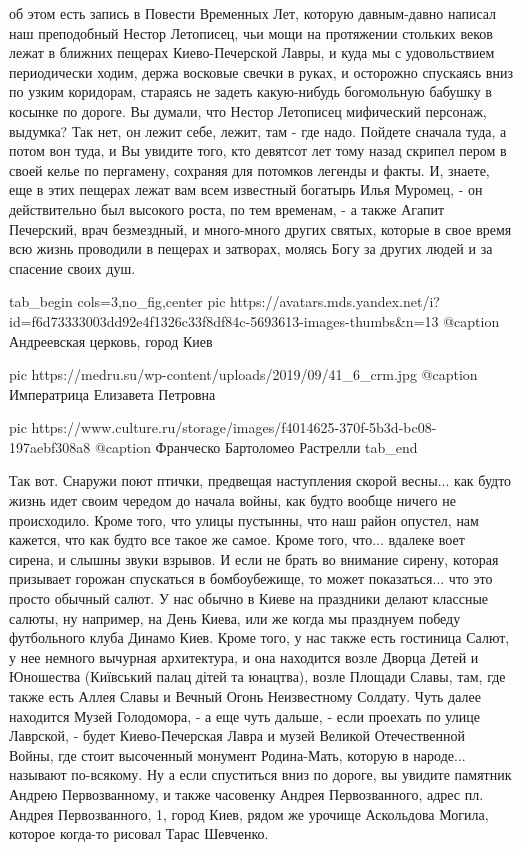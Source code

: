 об этом есть запись в Повести Временных Лет, которую давным-давно написал наш
преподобный Нестор Летописец, чьи мощи на протяжении стольких веков лежат в
ближних пещерах Киево-Печерской Лавры, и куда мы с удовольствием периодически
ходим, держа восковые свечки в руках, и осторожно спускаясь вниз по узким
коридорам, стараясь не задеть какую-нибудь богомольную бабушку в
косынке по дороге. Вы думали, что Нестор Летописец мифический персонаж,
выдумка? Так нет, он лежит себе, лежит, там - где надо. Пойдете сначала туда, а
потом вон туда, и Вы увидите того, кто девятсот лет тому назад скрипел пером в
своей келье по пергамену, сохраняя для потомков легенды и факты. И, знаете, еще
в этих пещерах лежат вам всем известный богатырь Илья Муромец, - он
действительно был высокого роста, по тем временам, - а также Агапит Печерский,
врач безмездный, и много-много других святых, которые в свое время всю жизнь
проводили в пещерах и затворах, молясь Богу за других людей и за спасение своих
душ.

\ifcmt
  tab_begin cols=3,no_fig,center
     pic https://avatars.mds.yandex.net/i?id=f6d73333003dd92e4f1326c33f8df84c-5693613-images-thumbs&n=13
		 @caption Андреевская церковь, город Киев

		 pic https://medru.su/wp-content/uploads/2019/09/41_6_crm.jpg
		 @caption Императрица Елизавета Петровна

		 pic https://www.culture.ru/storage/images/f4014625-370f-5b3d-bc08-197aebf308a8
		 @caption Франческо Бартоломео Растрелли
  tab_end
\fi

Так вот. Снаружи поют птички, предвещая наступления скорой весны... как будто
жизнь идет своим чередом до начала войны, как будто вообще ничего не
происходило. Кроме того, что улицы пустынны, что наш район опустел, нам
кажется, что как будто все такое же самое. Кроме того, что... вдалеке воет
сирена, и слышны звуки взрывов.  И если не брать во внимание сирену, которая
призывает горожан спускаться в бомбоубежище, то может показаться... что это
просто обычный салют. У нас обычно в Киеве на праздники делают классные салюты,
ну например, на День Киева, или же когда мы празднуем победу футбольного клуба
Динамо Киев. Кроме того, у нас также есть гостиница Салют, у нее немного
вычурная архитектура, и она находится возле Дворца Детей и Юношества (Київський
палац дітей та юнацтва), возле Площади Славы, там, где также есть Аллея Славы и
Вечный Огонь Неизвестному Солдату. Чуть далее находится Музей Голодомора, - а
еще чуть дальше, - если проехать по улице Лаврской, - будет Киево-Печерская
Лавра и музей Великой Отечественной Войны, где стоит высоченный монумент
Родина-Мать, которую в народе... называют по-всякому. Ну а если спуститься
вниз по дороге, вы увидите памятник Андрею Первозванному, и также часовенку
Андрея Первозванного, адрес пл. Андрея Первозванного, 1, город Киев, рядом же
урочище Аскольдова Могила, которое когда-то рисовал Тарас Шевченко.

